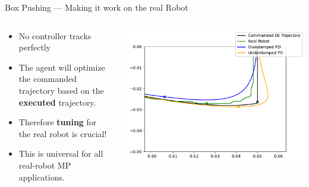 \documentclass[16:9,en,navbarinfooter]{sdqbeamer}
\begin{document}
\begin{frame}{Box Pushing --- Making it work on the real Robot}
\begin{columns}
    \begin{column}{0.5\textwidth}
        \begin{itemize}
                \item No controller tracks perfectly
                \item The agent will optimize the commanded trajectory based on the \textbf{executed} trajectory.
                \item Therefore \textbf{tuning} for the real robot is crucial!
                \item This is universal for all real-robot MP applications.
        \end{itemize}
    \end{column}
    \begin{column}{0.5\textwidth}
\includegraphics[width=\linewidth]{media/traj_error.pdf}
    \end{column}
\end{columns}

\end{frame}
\end{document}
